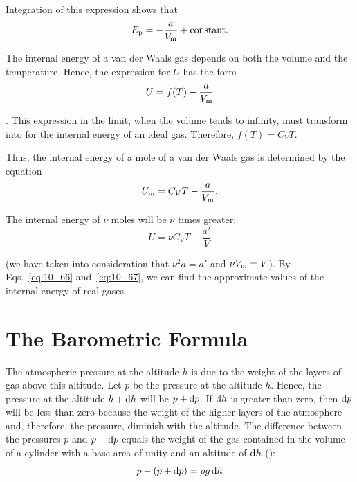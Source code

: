 \noindent
Integration of this expression shows that
\begin{equation}\label{eq:10_65}
	E_{\text{p}} = -\frac{a}{V_{\text{m}}} + \text{constant}.
\end{equation}

The internal energy of a van der Waals gas depends on both the volume and the temperature. Hence, the expression for $U$ has the form
\begin{equation*}
	U = f(T) - \frac{a}{V_{\text{m}}}
\end{equation*}

. This expression in the limit, when the volume tends to infinity, must transform into  for the internal energy of an ideal gas. Therefore, $f(T)=C_VT$.

Thus, the internal energy of a mole of a van der Waals gas is determined by the equation
\begin{equation}\label{eq:10_66}
	U_{\text{m}} = C_VT - \frac{a}{V_{\text{m}}}.
\end{equation}

\noindent
The internal energy of $\nu$ moles will be $\nu$ times greater:
\begin{equation}\label{eq:10_67}
	U = \nu C_VT - \frac{a'}{V}
\end{equation}

\noindent
(we have taken into consideration that $\nu^2a=a'$ and $\nu V_{\text{m}}=V$). By Eqs.~\eqref{eq:10_66} and~\eqref{eq:10_67}, we can find the approximate values of the internal energy of real gases.

\section{The Barometric Formula}\label{sec:10_14}

The atmospheric pressure at the altitude $h$ is due to the weight of the layers of gas above this altitude. Let $p$ be the pressure at the altitude $h$. Hence, the pressure at the altitude $h+\mathrm{d} h$ will be $p+\mathrm{d} p$. If $\mathrm{d} h$ is greater than zero, then $\mathrm{d} p$ will be less than zero because the weight of the higher layers of the atmosphere and, therefore, the pressure, diminish with the altitude. The difference between the pressures $p$ and $p+\mathrm{d} p$ equals the weight of the gas contained in the volume of a cylinder with a base area of unity and an altitude of $\mathrm{d} h$ ():
\begin{equation*}
	p - (p + \mathrm{d} p) = \rho g\,\mathrm{d} h
\end{equation*}


